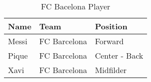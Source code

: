 
\setlength{\arrayrulewidth}{.1mm}   %
\setlength{\tabcolsep}{20pt}        %
\renewcommand{\arraystretch}{2}     %


\begin{table}[!htbp]
    \centering
    \begin{tabular}{|l|l|l|}
    \hline
      Name  & Team         & Position      \\ \hline
      Messi & FC Barcelona & Forward       \\ \hline
      Pique & FC Barcelona & Center - Back \\ \hline
      Xavi  & FC Barcelona & Midfilder     \\ \hline
    \end{tabular}
    \caption{FC Bacelona Player}
    \label{tab:my_label}
\end{table}

